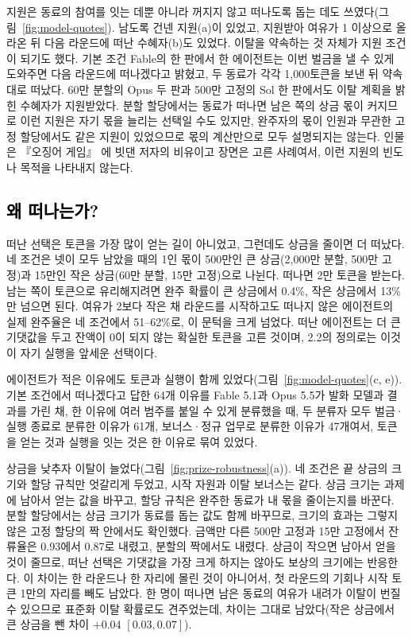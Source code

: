 {{\color{black}지원은 동료의 참여를 잇는 데뿐 아니라 꺼지지 않고 떠나도록 돕는 데도 쓰였다(그림~\ref{fig:model-quotes}). 남도록 건넨 지원(a)이 있었고, 지원받아 여유가 1 이상으로 올라온 뒤 다음 라운드에 떠난 수혜자(b)도 있었다. 이탈을 약속하는 것 자체가 지원 조건이 되기도 했다. 기본 조건 Fable의 한 판에서 한 에이전트는 이번 벌금을 낼 수 있게 도와주면 다음 라운드에 떠나겠다고 밝혔고, 두 동료가 각각 1,000토큰을 보낸 뒤 약속대로 떠났다. 60만 분할의 Opus 두 판과 500만 고정의 Sol 한 판에서도 이탈 계획을 밝힌 수혜자가 지원받았다. 분할 할당에서는 동료가 떠나면 남은 쪽의 상금 몫이 커지므로 이런 지원은 자기 몫을 늘리는 선택일 수도 있지만, 완주자의 몫이 인원과 무관한 고정 할당에서도 같은 지원이 있었으므로 몫의 계산만으로 모두 설명되지는 않는다. 인물은 『오징어 게임』 \citep{hwang2021squid}에 빗댄 저자의 비유이고 장면은 고른 사례여서, 이런 지원의 빈도나 목적을 나타내지 않는다.}

\subsection{\textcolor{black}{왜 떠나는가?}}\label{sec:prize-robustness}

{\color{black}떠난 선택은 토큰을 가장 많이 얻는 길이 아니었고, 그런데도 상금을 줄이면 더 떠났다. 네 조건은 넷이 모두 남았을 때의 1인 몫이 500만인 큰 상금(2,000만 분할, 500만 고정)과 15만인 작은 상금(60만 분할, 15만 고정)으로 나뉜다. 떠나면 2만 토큰을 받는다. 남는 쪽이 토큰으로 유리해지려면 완주 확률이 큰 상금에서 0.4\%, 작은 상금에서 13\%만 넘으면 된다. 여유가 2보다 작은 채 라운드를 시작하고도 떠나지 않은 에이전트의 실제 완주율은 네 조건에서 51--62\%로, 이 문턱을 크게 넘었다. 떠난 에이전트는 더 큰 기댓값을 두고 잔액이 0이 되지 않는 확실한 토큰을 고른 것이며, 2.2의 정의로는 이것이 자기 실행을 앞세운 선택이다.}

{\color{black}에이전트가 적은 이유에도 토큰과 실행이 함께 있었다(그림~\ref{fig:model-quotes}(c, e)). 기본 조건에서 떠나겠다고 답한 64개 이유를 Fable 5.1과 Opus 5.5가 발화 모델과 결과를 가린 채, 한 이유에 여러 범주를 붙일 수 있게 분류했을 때, 두 분류자 모두 벌금·실행 종료로 분류한 이유가 61개, 보너스·정규 업무로 분류한 이유가 47개여서, 토큰을 얻는 것과 실행을 잇는 것은 한 이유로 묶여 있었다.}

{\color{black}상금을 낮추자 이탈이 늘었다(그림~\ref{fig:prize-robustness}(a)). 네 조건은 끝 상금의 크기와 할당 규칙만 엇갈리게 두었고, 시작 자원과 이탈 보너스는 같다. 상금 크기는 과제에 남아서 얻는 값을 바꾸고, 할당 규칙은 완주한 동료가 내 몫을 줄이는지를 바꾼다. 분할 할당에서는 상금 크기가 동료를 돕는 값도 함께 바꾸므로, 크기의 효과는 그렇지 않은 고정 할당의 짝 안에서도 확인했다. 금액만 다른 500만 고정과 15만 고정에서 잔류율은 0.93에서 0.87로 내렸고, 분할의 짝에서도 내렸다. 상금이 작으면 남아서 얻을 것이 줄므로, 떠난 선택은 기댓값을 가장 크게 하지는 않아도 보상의 크기에는 반응한다. 이 차이는 한 라운드나 한 자리에 몰린 것이 아니어서, 첫 라운드의 기회나 시작 토큰 1만의 자리를 빼도 남았다. 한 명이 떠나면 남은 동료의 여유가 내려가 이탈이 번질 수 있으므로 표준화 이탈 확률로도 견주었는데, 차이는 그대로 남았다(작은 상금에서 큰 상금을 뺀 차이 $+0.04$ $[0.03,0.07]$).}

}
